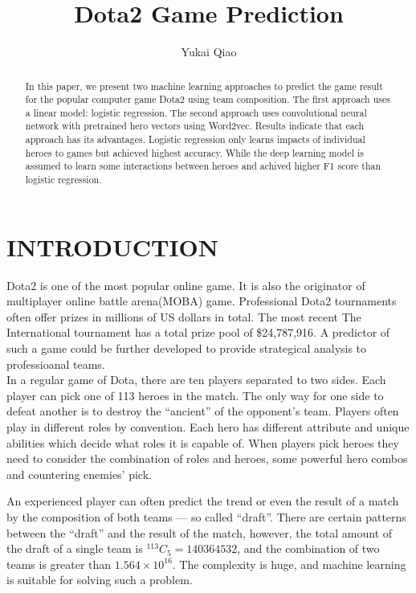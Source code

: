 \documentclass[a4paper, 10pt, conference]{ieeeconf}
\title{\LARGE \bf
Dota2 Game Prediction
}
\author{Yukai Qiao
}
\newcommand*{\Comb}[2]{{}^{#1}C_{#2}}%
\begin{document}
\maketitle
\thispagestyle{empty}
\pagestyle{empty}


\begin{abstract}

In this paper, we present two machine learning approaches to predict the game result for the popular computer game Dota2 using team composition. The first approach uses a linear model: logistic regression. The second approach uses convolutional neural network with pretrained hero vectors using Word2vec. Results indicate that each approach has its advantages. Logistic regression only learns impacts of individual heroes to games but achieved highest accuracy. While the deep learning model is assumed to learn some interactions between heroes and achived higher F1 score than logistic regression.

\end{abstract}


\section{INTRODUCTION}

Dota2 is one of the most popular online game. It is also the originator of multiplayer online battle arena(MOBA) game. Professional Dota2 tournaments often offer prizes in millions of US dollars in total. The most recent The International tournament has a total prize pool of \$24,787,916\cite{track}.  A predictor of such a game could be further developed to provide strategical analysis to professioanal teams.\\

In a regular game of Dota, there are ten players separated to two sides. Each player can pick one of 113 heroes in the match. The only way for one side to defeat another is to destroy the ``ancient'' of the opponent's team. Players often play in different roles by convention. Each hero has different attribute and unique abilities which decide what roles it is capable of. When players pick heroes they need to consider the combination of roles and heroes, some powerful hero combos and countering enemies' pick. 

An experienced player can often predict the trend or even the result of a match by the composition of both teams --- so called ``draft''. There are certain patterns between the ``draft'' and the result of the match, however, the total amount of the draft of a single team is $\Comb{113}{5}=140364532 $, and the combination of two teams is greater than $1.564\times10^{16}$. The complexity is huge, and machine learning is suitable for solving such a problem.\\
\end{document}
